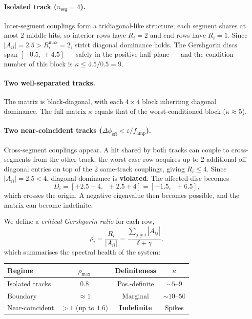 \documentclass[12pt,a4paper]{article}
\begin{document}
\paragraph{Isolated track ($n_\text{seg} = 4$).}
Inter-segment couplings form a tridiagonal-like structure; each segment
shares at most 2 middle hits, so interior rows have $R_i = 2$ and end rows
have $R_i = 1$.
Since $|A_{ii}| = 2.5 > R_i^{\max} = 2$, strict diagonal dominance holds.
The Gershgorin discs span $[+0.5,\,+4.5]$ — safely in the positive
half-plane — and the condition number of this block is
$\kappa \leq 4.5/0.5 = 9$.

\paragraph{Two well-separated tracks.}
The matrix is block-diagonal, with each $4\times4$ block inheriting
diagonal dominance.
The full matrix $\kappa$ equals that of the worst-conditioned block
($\kappa \approx 5$).

\paragraph{Two near-coincident tracks
($\Delta\phi_\text{eff} < \varepsilon/f_\text{amp}$).}
Cross-segment couplings appear.
A hit shared by both tracks can couple to cross-segments from the other
track; the worst-case row acquires up to 2 additional off-diagonal entries
on top of the 2 same-track couplings, giving $R_i \leq 4$.
Since $|A_{ii}| = 2.5 < 4$, diagonal dominance is \textbf{violated}.
The affected disc becomes
\begin{equation}
  D_i = [+2.5 - 4,\;\; +2.5 + 4] = [-1.5,\;\; +6.5],
  \label{eq:disc_coupled}
\end{equation}
which crosses the origin.
A negative eigenvalue then becomes possible, and the matrix can become
indefinite.

We define a \emph{critical Gershgorin ratio} for each row,
\begin{equation}
  \rho_i = \frac{R_i}{|A_{ii}|} = \frac{\sum_{j \neq i}|A_{ij}|}{\delta + \gamma},
  \label{eq:gershgorin_ratio}
\end{equation}
which summarises the spectral health of the system:
\begin{center}
\begin{tabular}{lccc}
  \toprule
  Regime & $\rho_\text{max}$ & Definiteness & $\kappa$ \\
  \midrule
  Isolated tracks & $0.8$ & Pos.-definite & $\sim$$5\text{--}9$ \\
  Boundary        & $\approx 1$ & Marginal     & $\sim$$10\text{--}50$ \\
  Near-coincident & $>1$ (up to $1.6$) & \textbf{Indefinite} & Spikes \\
  \bottomrule
\end{tabular}
\end{center}
\end{document}
